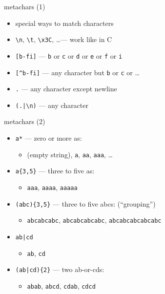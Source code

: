 \begin{frame}[fragile,label=meta1]{metachars (1)}
    \begin{itemize}
    \item special ways to match characters
    \vspace{.5cm}
    \item \verb|\n|, \verb|\t|, \verb|\x3C|, \ldots --- work like in C
    \item \verb|[b-fi]| --- {\tt b} or {\tt c} or {\tt d} or {\tt e} or {\tt f} or {\tt i}
    \item \verb|[^b-fi]| --- any character but {\tt b} or {\tt c} or \ldots
    \item {\tt .} --- any character except newline
    \item \verb!(.|\n)! --- any character
    \end{itemize}
\end{frame}

\begin{frame}[fragile,label=meta2]{metachars (2)}
    \begin{itemize}
    \item \verb|a*| --- zero or more as:
        \begin{itemize}
        \item (empty string), {\tt a}, {\tt aa}, {\tt aaa}, \ldots
        \end{itemize}
    \item \verb|a{3,5}| --- three to five as:
        \begin{itemize}
        \item {\tt aaa}, {\tt aaaa}, {\tt aaaaa}
        \end{itemize}
    \item \verb!(abc){3,5}! --- three to five abcs: (``grouping'')
        \begin{itemize}
        \item {\tt abcabcabc}, {\tt abcabcabcabc}, {\tt abcabcabcabcabc}
        \end{itemize}
    \item {\tt ab|cd}
        \begin{itemize}
        \item {\tt ab}, {\tt cd}
        \end{itemize}
    \item \verb!(ab|cd){2}! --- two ab-or-cds:
        \begin{itemize} 
        \item {\tt abab}, {\tt abcd}, {\tt cdab}, {\tt cdcd}
        \end{itemize}
    \end{itemize}
\end{frame}

